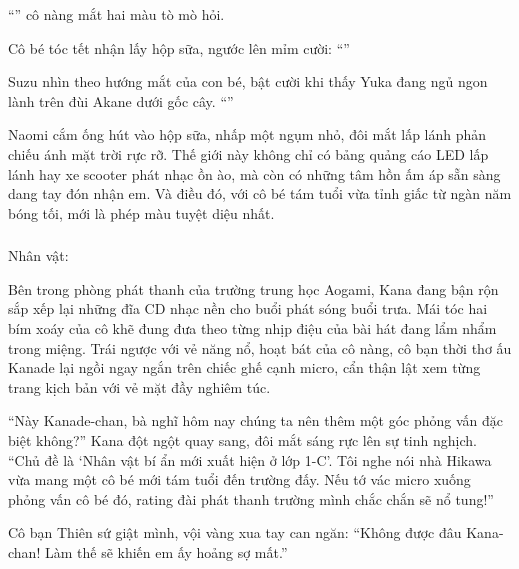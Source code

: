 \documentclass[../main.tex]{subfiles}
\begin{document}
``'' cô nàng mắt hai màu tò mò hỏi.

Cô bé tóc tết nhận lấy hộp sữa, ngước lên mỉm cười: ``''

Suzu nhìn theo hướng mắt của con bé, bật cười khi thấy Yuka đang ngủ ngon lành trên đùi Akane dưới gốc cây. ``''

Naomi cắm ống hút vào hộp sữa, nhấp một ngụm nhỏ, đôi mắt lấp lánh phản chiếu ánh mặt trời rực rỡ. Thế giới này không chỉ có bảng quảng cáo LED lấp lánh hay xe scooter phát nhạc ồn ào, mà còn có những tâm hồn ấm áp sẵn sàng dang tay đón nhận em. Và điều đó, với cô bé tám tuổi vừa tỉnh giấc từ ngàn năm bóng tối, mới là phép màu tuyệt diệu nhất.

\newpage

\subsubsection*{\label{ep-ER2}}
\begin{center}{\caviar Nhân vật:  }\end{center}

Bên trong phòng phát thanh của trường trung học Aogami, Kana đang bận rộn sắp xếp lại những đĩa CD nhạc nền cho buổi phát sóng buổi trưa. Mái tóc hai bím xoáy của cô khẽ đung đưa theo từng nhịp điệu của bài hát đang lẩm nhẩm trong miệng. Trái ngược với vẻ năng nổ, hoạt bát của cô nàng, cô bạn thời thơ ấu Kanade lại ngồi ngay ngắn trên chiếc ghế cạnh micro, cẩn thận lật xem từng trang kịch bản với vẻ mặt đầy nghiêm túc.

``Này Kanade-chan, bà nghĩ hôm nay chúng ta nên thêm một góc phỏng vấn đặc biệt không?'' Kana đột ngột quay sang, đôi mắt sáng rực lên sự tinh nghịch. ``Chủ đề là `Nhân vật bí ẩn mới xuất hiện ở lớp 1-C'. Tôi nghe nói nhà Hikawa vừa mang một cô bé mới tám tuổi đến trường đấy. Nếu tớ vác micro xuống phỏng vấn cô bé đó, rating đài phát thanh trường mình chắc chắn sẽ nổ tung!''

Cô bạn Thiên sứ giật mình, vội vàng xua tay can ngăn: ``Không được đâu Kana-chan! Làm thế sẽ khiến em ấy hoảng sợ mất.''
\end{document}
